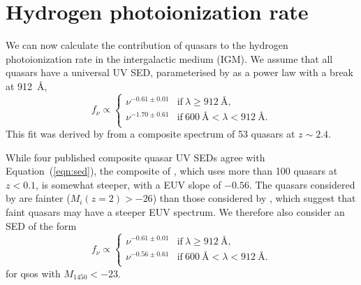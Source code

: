 \documentclass[a4paper,fleqn,usenatbib]{mnras}
\begin{document}
\section{Hydrogen photoionization rate}

We can now calculate the contribution of quasars to the hydrogen
photoionization rate in the intergalactic medium (IGM).  We assume
that all quasars have a universal UV SED, parameterised by
\citet{2015MNRAS.449.4204L} as a power law with a break at 912~{\AA},
\begin{equation}
f_\nu\propto\begin{cases}
               \nu^{-0.61\pm 0.01} & \text{if}~\lambda\geq 912~\text{\AA},\\
               \nu^{-1.70\pm 0.61} & \text{if}~600~\text{\AA}<\lambda<912~\text{\AA}.\\                
               \end{cases}
\label{eqn:sed}
\end{equation}
This fit was derived by \citet{2015MNRAS.449.4204L} from a composite
spectrum of 53 quasars at $z\sim 2.4$.

While four published composite quasar UV SEDs
\citep{2002ApJ...565..773T, 2001AJ....122..549V, 2012ApJ...752..162S,
  2014ApJ...794...75S} agree with Equation~(\ref{eqn:sed}), the
composite of \citet{2004ApJ...615..135S}, which uses more than 100
quasars at $z<0.1$, is somewhat steeper, with a EUV slope of $-0.56$.
The quasars considered by \citet{2004ApJ...615..135S} are fainter
($M_i(z=2)>-26$) than those considered by \citet{2015MNRAS.449.4204L},
which suggest that faint quasars may have a steeper EUV spectrum.  We
therefore also consider an SED of the form
\begin{equation}
f_\nu\propto\begin{cases}
               \nu^{-0.61\pm 0.01} & \text{if}~\lambda\geq 912~\text{\AA},\\
               \nu^{-0.56\pm 0.61} & \text{if}~600~\text{\AA}<\lambda<912~\text{\AA}.\\                
               \end{cases}
\label{eqn:sed_faint}
\end{equation}
for qsos with $M_{1450}<-23$.
\end{document}
